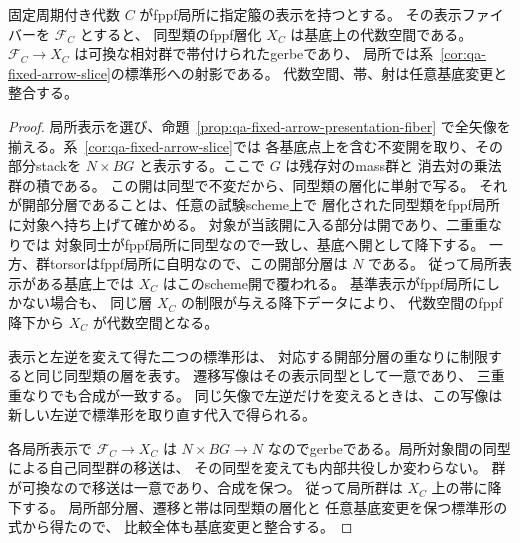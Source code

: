 \begin{corollary}[局所標準形の降下と表示ファイバーの剛体化]
\label{cor:qa-fixed-fiber-sheaf-descent}
固定周期付き代数 $C$ がfppf局所に指定箙の表示を持つとする。
その表示ファイバーを $\mathscr F_C$ とすると、
同型類のfppf層化 $X_C$ は基底上の代数空間である。
$\mathscr F_C\to X_C$ は可換な相対群で帯付けられたgerbeであり、
局所では系~\ref{cor:qa-fixed-arrow-slice}の標準形への射影である。
代数空間、帯、射は任意基底変更と整合する。
\end{corollary}
\begin{proof}
局所表示を選び、命題~\ref{prop:qa-fixed-arrow-presentation-fiber}
で全矢像を揃える。系~\ref{cor:qa-fixed-arrow-slice}では
各基底点上を含む不変開を取り、その部分stackを
$N\times B G$ と表示する。ここで $G$ は残存対のmass群と
消去対の乗法群の積である。
この開は同型で不変だから、同型類の層化に単射で写る。
それが開部分層であることは、任意の試験scheme上で
層化された同型類をfppf局所に対象へ持ち上げて確かめる。
対象が当該開に入る部分は開であり、二重重なりでは
対象同士がfppf局所に同型なので一致し、基底へ開として降下する。
一方、群torsorはfppf局所に自明なので、この開部分層は $N$ である。
従って局所表示がある基底上では $X_C$ はこのscheme開で覆われる。
基準表示がfppf局所にしかない場合も、
同じ層 $X_C$ の制限が与える降下データにより、
代数空間のfppf降下から $X_C$ が代数空間となる。

表示と左逆を変えて得た二つの標準形は、
対応する開部分層の重なりに制限すると同じ同型類の層を表す。
遷移写像はその表示同型として一意であり、
三重重なりでも合成が一致する。
同じ矢像で左逆だけを変えるときは、この写像は
新しい左逆で標準形を取り直す代入で得られる。

各局所表示で $\mathscr F_C\to X_C$ は $N\times BG\to N$
なのでgerbeである。局所対象間の同型による自己同型群の移送は、
その同型を変えても内部共役しか変わらない。
群が可換なので移送は一意であり、合成を保つ。
従って局所群は $X_C$ 上の帯に降下する。
局所部分層、遷移と帯は同型類の層化と
任意基底変更を保つ標準形の式から得たので、
比較全体も基底変更と整合する。
\end{proof}

